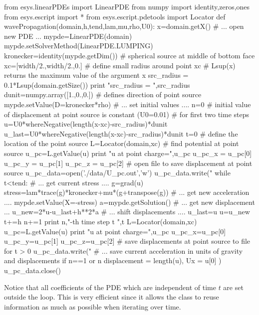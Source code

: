 \begin{python}
from esys.linearPDEs import LinearPDE
from numpy import identity,zeros,ones
from esys.escript import *
from esys.escript.pdetools import Locator
def wavePropagation(domain,h,tend,lam,mu,rho,U0):
   x=domain.getX()
   # ... open new PDE ...
   mypde=LinearPDE(domain)
   mypde.setSolverMethod(LinearPDE.LUMPING)
   kronecker=identity(mypde.getDim())
   #  spherical source at middle of bottom face
   xc=[width/2.,width/2.,0.] 
   # define small radius around point xc
   # Lsup(x) returns the maximum value of the argument x
   src_radius = 0.1*Lsup(domain.getSize())
   print "src_radius = ",src_radius
   dunit=numpy.array([1.,0.,0.]) # defines direction of point source
   mypde.setValue(D=kronecker*rho)
   # ... set initial values ....
   n=0
   # initial value of displacement at point source is constant (U0=0.01)
   # for first two time steps
   u=U0*whereNegative(length(x-xc)-src_radius)*dunit
   u_last=U0*whereNegative(length(x-xc)-src_radius)*dunit
   t=0
   # define the location of the point source
   L=Locator(domain,xc)
   # find potential at point source
   u_pc=L.getValue(u)
   print "u at point charge=",u_pc
   u_pc_x = u_pc[0]
   u_pc_y = u_pc[1]
   u_pc_z = u_pc[2]
   # open file to save displacement at point source
   u_pc_data=open('./data/U_pc.out','w')
   u_pc_data.write("%
   while t<tend:
     # ... get current stress ....
     g=grad(u)
     stress=lam*trace(g)*kronecker+mu*(g+transpose(g))
     # ... get new acceleration ....
     mypde.setValue(X=-stress)
     a=mypde.getSolution()
     # ... get new displacement ...
     u_new=2*u-u_last+h**2*a
     # ... shift displacements ....
     u_last=u
     u=u_new
     t+=h
     n+=1
     print n,"-th time step t ",t
     L=Locator(domain,xc)
     u_pc=L.getValue(u)
     print "u at point charge=",u_pc
     u_pc_x=u_pc[0]
     u_pc_y=u_pc[1]
     u_pc_z=u_pc[2]
     # save displacements at point source to file for t > 0
     u_pc_data.write("%
     # ... save current acceleration in units of gravity and displacements
     if n==1 or n%
     displacement = length(u), Ux = u[0] )
   u_pc_data.close()
\end{python}
Notice that 
all coefficients of the PDE which are independent of time $t$ are set outside the  
loop. This is very efficient since it allows the \LinearPDE class to reuse information as much as possible 
when iterating over time.  
 
